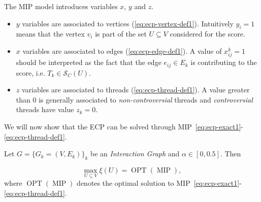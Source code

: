 The \acrshort{MIP} model introduces variables $x$, $y$ and $z$.
\begin{itemize}
	\item $y$ variables are associated to vertices
	      (\autoref{eq:ecp-vertex-def1}). Intuitively $y_i = 1$ means that the
	      vertex $v_{i} $ is part of the set $U \subseteq V$ considered for the
	      score.
	\item $x$ variables are associated to edges (\autoref{eq:ecp-edge-def1}).
	      A value of $x_{ij}^{k} = 1$ should be interpreted as the fact that
	      the edge $e_{ij} \in E_k$ is contributing to the score,
	      i.e. $T_k \in \mathcal{S}_{C} (U)$.
	\item $z$ variables are associated to threads
	      (\autoref{eq:ecp-thread-def1}). A value greater than 0
	      is generally associated to \emph{non-controversial} threads and
	      \emph{controversial} threads have value $z_k = 0$.
\end{itemize}

We will now show that the \acrshort{ECP} can be solved through
MIP~\eqref{eq:ecp-exact1}-\eqref{eq:ecp-thread-def1}.

\begin{theorem}
	\label{th:ecp-mip}
	Let $G = \{G_k = (V,E_k) \}_k$ be an \emph{Interaction Graph} and $\alpha \in
		[0, 0.5]$. Then

	\begin{equation}
		\max_{U \subseteq V} \xi(U) = \operatorname{OPT}(\operatorname{MIP}),
	\end{equation}
	where $\operatorname{OPT}(\operatorname{MIP})$ denotes the optimal solution to
	MIP~\eqref{eq:ecp-exact1}-\eqref{eq:ecp-thread-def1}.
\end{theorem}

